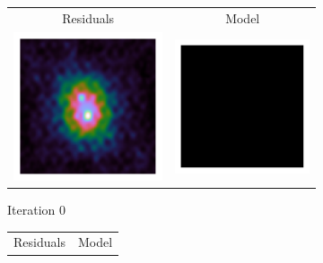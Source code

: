 \begin{figure}[h]
	\centering
	\begin{subfigure}[b]{0.45\linewidth}
		\centering
		\begin{tabular}{c c}
			Residuals & Model \\
			\includegraphics[width=0.45\linewidth, clip, trim= 1.0in 1.0in 1.0in 1.0in]{./chapters/01.intro/cleanExample/dirty_CLEAN_0.png} & \includegraphics[width=0.45\linewidth, clip, trim= 1.0in 1.0in 1.0in 1.0in]{./chapters/01.intro/cleanExample/model_CLEAN_0.png} 
		\end{tabular}
		\caption{Iteration 0}
	\end{subfigure}
	\begin{subfigure}[b]{0.45\linewidth}
		\begin{tabular}{c c}
			Residuals & Model \\

\end{tabular}
\end{subfigure}
\end{figure}
